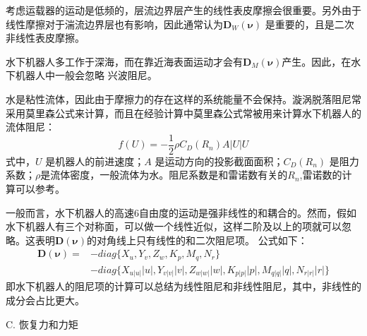 考虑运载器的运动是低频的，层流边界层产生的线性表皮摩擦会很重要。另外由于线性摩擦对于湍流边界层也有影响，因此通常认为$\bm{D}_W(\bm{\nu})$ 是重要的，且是二次非线性表皮摩擦。

水下机器人多工作于深海，而在靠近海表面运动才会有$\bm{D}_M(\bm{\nu})$产生。因此，在水下机器人中一般会忽略 兴波阻尼。

水是粘性流体，因此由于摩擦力的存在这样的系统能量不会保持。漩涡脱落阻尼常采用莫里森公式来计算，而且在经验计算中莫里森公式常被用来计算水下机器人的流体阻尼：
\begin{equation}
\label{eq:chap2:25}
f(U)=-\frac{1}{2} \rho C_{D}(R_n)A \left |U \right | U
\end{equation}
式中，$U$ 是机器人的前进速度；$A$ 是运动方向的投影截面面积；$C_{D}(R_n)$ 是阻力系数；$\rho$是流体密度，一般流体为水。阻尼系数是和雷诺数有关的$R_n$,雷诺数的计算可以参考\cite{fossen1994guidance}。

一般而言，水下机器人的高速6自由度的运动是强非线性的和耦合的。然而，假如水下机器人有三个对称面，可以做一个线性近似，这样二阶及以上的项就可以忽略。这表明$\bm{D}(\bm{\nu})$的对角线上只有线性的和二次阻尼项。 公式如下：
\begin{equation}
\label{eq:chap2:26}
\begin{aligned}
\bm{D}(\bm{\nu})= &- diag\{ X_u,Y_v,Z_w,K_p,M_q,N_r\}   \\
                  &- diag\{ X_{u\left|u\right|} \left|u\right|, Y_{v\left|v\right|} \left|v\right| , Z_{w\left|w\right|} \left|w\right|, K_{p\left|p\right|} \left|p\right| , M_{q \left| q \right|} \left| q \right|, N_{r \left| r \right|} \left| r \right|  \}
\end{aligned}
\end{equation}
即水下机器人的阻尼项的计算可以总结为线性阻尼和非线性阻尼，其中，非线性的成分会占比更大。

C. 恢复力和力矩

